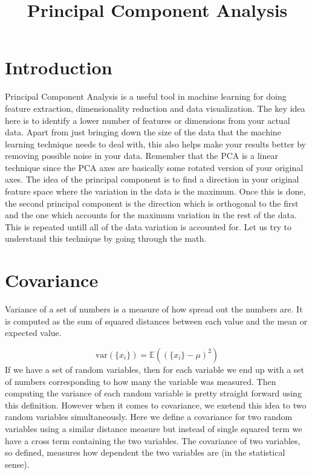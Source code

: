\documentclass{../template/texnote}
\title{\textbf{Principal Component Analysis}}[author={Linn Abraham}]
\begin{document}
    \maketitle {}
\section{Introduction}
Principal Component Analysis is a useful tool in machine learning for doing feature extraction, dimensionality reduction and data visualization.
The key idea here is to identify a lower number of features or dimensions from your actual data.
Apart from just bringing down the size of the data that the machine learning technique needs to deal with, this also helps make your results better by removing possible noise in your data.
Remember that the PCA is a linear technique since the PCA axes are basically some rotated version of your original axes.
The idea of the principal component is to find a direction in your original feature space where the variation in the data is the maximum.
Once this is done, the second principal component is the direction which is orthogonal to the first and the one which accounts for the maximum variation in the rest of the data.
This is repeated untill all of the data variation is accounted for.
Let us try to understand this technique by going through the math.
\section{Covariance}
Variance of a set of numbers is a measure of how spread out the numbers are.
It is computed as the sum of squared distances between each value and the mean or expected value.

\[
\text{var}(\{x_i\}) = \mathbb{E}((\{x_i\} - \mu)^2)
\]
If we have a set of random variables, then for each variable we end up with a set of numbers corresponding to how many the variable was measured.
Then computing the variance of each random variable is pretty straight forward using this definition.
However when it comes to covariance, we exetend this idea to two random variables simultaneously.
Here we define a covariance for two random variables using a similar distance measure but instead of single squared term we have a cross term containing the two variables.
The covariance of two variables, so defined, measures how dependent the two variables are (in the statistical sense).
\end{document}
